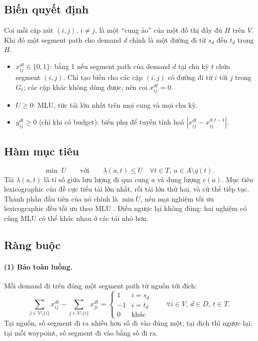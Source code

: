 \documentclass[11pt,a4paper]{article}
\begin{document}
\subsection{Biến quyết định}

Coi mỗi cặp nút $(i,j)$, $i\neq j$, là một ``cung ảo'' của một đồ thị đầy đủ $H$ trên $V$.
Khi đó một segment path cho demand $d$ chính là một đường đi từ $s_d$ đến $t_d$ trong $H$.
\begin{itemize}
\item $x^{dt}_{ij}\in\{0,1\}$: bằng 1 nếu segment path của demand $d$ tại chu kỳ $t$ chứa segment $(i,j)$. Chỉ tạo biến cho các cặp $(i,j)$ có đường đi từ $i$ tới $j$ trong $G_t$; các cặp khác không dùng được, nên coi $x^{dt}_{ij}=0$.
\item $U\ge 0$: MLU, tức tải lớn nhất trên mọi cung và mọi chu kỳ.
\item $y^{dt}_{ij}\ge 0$ (chỉ khi có budget): biến phụ để tuyến tính hoá $|x^{dt}_{ij}-x^{d,t-1}_{ij}|$.
\end{itemize}

\subsection{Hàm mục tiêu}

\begin{equation}
\min\; U \qquad\text{với}\qquad \lambda(a,t)\le U \quad \forall t\in T,\ a\in A\setminus q(t).
\end{equation}
Tải $\lambda(a,t)$ là tỉ số giữa lưu lượng đi qua cung $a$ và dung lượng $c(a)$.
Mục tiêu lexicographic của đề cực tiểu tải lớn nhất, rồi tải lớn thứ hai, và cứ thế tiếp tục.
Thành phần đầu tiên của nó chính là $\min U$, nên mọi nghiệm tối ưu lexicographic đều tối ưu theo MLU \cite{benhamiche2026}.
Điều ngược lại không đúng: hai nghiệm có cùng MLU có thể khác nhau ở các tải nhỏ hơn.

\subsection{Ràng buộc}

\paragraph{(1) Bảo toàn luồng.} Mỗi demand đi trên đúng một segment path từ nguồn tới đích:
\begin{equation}
\sum_{j\in V\setminus\{i\}} x^{dt}_{ij}-\sum_{j\in V\setminus\{i\}} x^{dt}_{ji}=
\begin{cases}1 & i=s_d\\-1 & i=t_d\\0&\text{khác}\end{cases}
\qquad\forall i\in V,\ d\in D,\ t\in T.
\end{equation}
Tại nguồn, số segment đi ra nhiều hơn số đi vào đúng một; tại đích thì ngược lại; tại mỗi waypoint, số segment đi vào bằng số đi ra.
\end{document}
